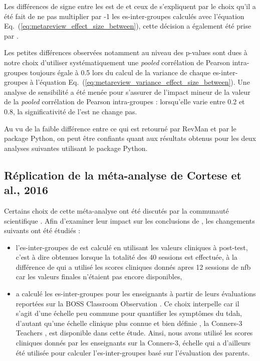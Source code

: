 Les différences de signe entre les \gls{est} de \citet{Cortese2016} et ceux de \citet{Bussalb2019clinical} s'expliquent par le choix qu'il a été fait de ne pas multiplier
par -1 les \gls{es}-inter-groupes calculés avec l'équation Eq.~(\ref{eq:metareview_effect_size_between}), cette décision a également été prise par 
\citet{Micoulaud2014}.

Les petites différences observées notamment au niveau des p-values sont dues à notre choix d'utiliser systématiquement une \textit{pooled} corrélation de Pearson 
intra-groupes toujours égale à 0.5 \citep{Balk2012} lors du calcul de la variance de chaque \gls{es}-inter-groupes à l'équation 
Eq.~(\ref{eq:metareview_variance_effect_size_between}). Une analyse de sensibilité a été menée pour s'assurer de l'impact mineur de la valeur de la \textit{pooled} 
corrélation de Pearson intra-groupes : lorsqu'elle varie entre 0.2 et 0.8, la significativité de l'\gls{est} ne change pas.

Au vu de la faible différence entre ce qui est retourné par RevMan et par le package Python, on peut être confiants quant aux résultats obtenus pour les 
deux analyses suivantes utilisant le package Python. 

\subsection{Réplication de la méta-analyse de Cortese et al., 2016} \label{replication}

Certains choix de cette méta-analyse ont été discutés par la communauté scientifique \citep{Micoulaud2016}. Afin d'examiner leur impact sur les conclusions
de \citet{Cortese2016}, les changements suivants ont été étudiés :

\begin{itemize}
\item l'\gls{es}-inter-groupes de \citet{Arnold2014} est calculé en utilisant les valeurs cliniques à post-test, c'est à dire obtenues lorsque la totalité 
des 40 sessions est effectuée, à la différence de \citet{Cortese2016} qui a utilisé les scores cliniques donnés apres 12 sessions de \gls{nfb} car les valeurs 
finales n'étaient pas encore disponibles,
\item \citet{Cortese2016} a calculé les \gls{es}-inter-groupes \citet{Steiner2014} pour les enseignants à partir de leurs évaluations reportées sur 
la BOSS Classroom Observation \citep{Shapiro2010}. Ce choix interpelle car il s'agit d'une échelle peu commune pour quantifier les symptômes du \gls{tdah}, d'autant qu'une échelle clinique 
plus connue et bien définie \citep{Collett2003, Epstein2012, Bluschke2016}, la Conners-3 Teachers \citep{Conners1998, Conners2008}, est disponible dans 
cette étude. Ainsi, nous avons utilisé les scores cliniques donnés par les enseignants sur la Conners-3, échelle 
qui a d'ailleurs été utilisée pour calculer l'\gls{es}-inter-groupes basé sur l'évaluation des parents. 
\end{itemize}

